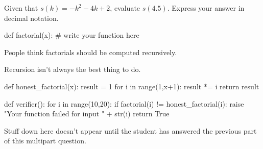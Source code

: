 \documentclass{ximera}
\begin{document}

\begin{python-exercise}
Given that $s(k)=-k^2-4 k+2$, evaluate $s(4.5)$. Express your answer in decimal notation.

\begin{scaffold}
def factorial(x):
  # write your function here
\end{scaffold}

\begin{solution}
\begin{hint}
People think factorials should be computed recursively.
\end{hint}
\begin{hint}
Recursion isn't always the best thing to do.
\end{hint}

\begin{verifier}
def honest_factorial(x):
  result = 1
  for i in range(1,x+1):
    result *= i
  return result

def verifier():
  for i in range(10,20):
    if factorial(i) != honest_factorial(i):
      raise "Your function failed for input " + str(i)
  return True
\end{verifier}
\end{solution}

Stuff down here doesn't appear until the student has answered the previous part of this multipart question.

\end{python-exercise}
\end{document}
